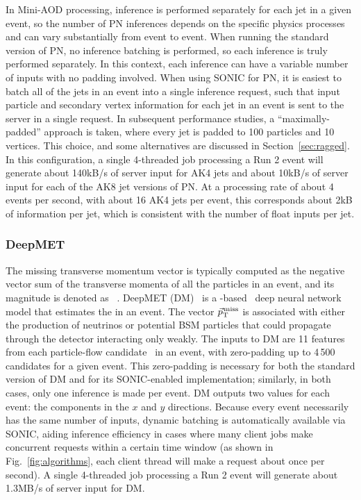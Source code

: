 In Mini-AOD processing, inference is performed separately for each jet in a given event, so the number of PN inferences depends on the specific physics processes and can vary substantially from event to event. When running the standard \CMSSW version of PN, no inference batching is performed, so each inference is truly performed separately. In this context, each inference can have a variable number of inputs with no padding involved. When using SONIC for PN, it is easiest to batch all of the jets in an event into a single inference request, such that input particle and secondary vertex information for each jet in an event is sent to the server in a single request. In subsequent performance studies, a ``maximally-padded'' approach is taken, where every jet is padded to 100 particles and 10 vertices. This choice, and some alternatives are discussed in Section~\ref{sec:ragged}. In this configuration, a single 4-threaded job processing a Run 2 \ttbar event will generate about 140\unit{kB/s} of server input for AK4 jets and about 10\unit{kB/s} of server input for each of the AK8 jet versions of PN. At a processing rate of about 4 events per second, with about 16 AK4 jets per event, this corresponds about 2\unit{kB} of information per jet, which is consistent with the number of float inputs per jet.


\subsubsection{DeepMET}
The missing transverse momentum vector \ptvecmiss is typically computed as the negative vector sum of the transverse momenta of all the particles in an event, and its magnitude is denoted as \ptmiss~\cite{CMS:2019ctu}. DeepMET (DM)~\cite{DeepMET} is a \TENSORFLOW-based~\cite{tensorflow} deep neural network model that estimates the \ptvecmiss in an event. The vector ${\vec p}_{\mathrm{T}}^{\kern1pt\text{miss}}$ is associated with either the production of neutrinos or potential BSM particles that could propagate through the detector interacting only weakly. The inputs to DM are 11 features from each particle-flow candidate~\cite{CMS:2017yfk} in an event, with zero-padding up to 4\,500 candidates for a given event. This zero-padding is necessary for both the standard version of DM and for its SONIC-enabled implementation; similarly, in both cases, only one inference is made per event. DM outputs two values for each event: the \ptvecmiss components in the $x$ and $y$ directions. Because every event necessarily has the same number of inputs, dynamic batching is automatically available via SONIC, aiding inference efficiency in cases where many client jobs make concurrent requests within a certain time window (as shown in Fig.~\ref{fig:algorithms}, each client thread will make a request about once per second). A single 4-threaded job processing a Run 2 \ttbar event will generate about 1.3\unit{MB/s} of server input for DM.

